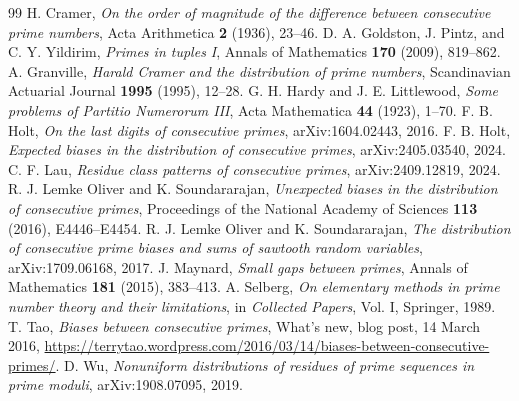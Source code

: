 \documentclass[10pt]{article}
\begin{document}
\begin{thebibliography}{99}
 H. Cramer, \emph{On the order of magnitude of the difference between consecutive prime numbers}, Acta Arithmetica \textbf{2} (1936), 23--46.
 D. A. Goldston, J. Pintz, and C. Y. Yildirim, \emph{Primes in tuples I}, Annals of Mathematics \textbf{170} (2009), 819--862.
 A. Granville, \emph{Harald Cramer and the distribution of prime numbers}, Scandinavian Actuarial Journal \textbf{1995} (1995), 12--28.
 G. H. Hardy and J. E. Littlewood, \emph{Some problems of Partitio Numerorum III}, Acta Mathematica \textbf{44} (1923), 1--70.
 F. B. Holt, \emph{On the last digits of consecutive primes}, arXiv:1604.02443, 2016.
 F. B. Holt, \emph{Expected biases in the distribution of consecutive primes}, arXiv:2405.03540, 2024.
 C. F. Lau, \emph{Residue class patterns of consecutive primes}, arXiv:2409.12819, 2024.
 R. J. Lemke Oliver and K. Soundararajan, \emph{Unexpected biases in the distribution of consecutive primes}, Proceedings of the National Academy of Sciences \textbf{113} (2016), E4446--E4454.
 R. J. Lemke Oliver and K. Soundararajan, \emph{The distribution of consecutive prime biases and sums of sawtooth random variables}, arXiv:1709.06168, 2017.
 J. Maynard, \emph{Small gaps between primes}, Annals of Mathematics \textbf{181} (2015), 383--413.
 A. Selberg, \emph{On elementary methods in prime number theory and their limitations}, in \emph{Collected Papers}, Vol. I, Springer, 1989.
 T. Tao, \emph{Biases between consecutive primes}, What's new, blog post, 14 March 2016, \url{https://terrytao.wordpress.com/2016/03/14/biases-between-consecutive-primes/}.
 D. Wu, \emph{Nonuniform distributions of residues of prime sequences in prime moduli}, arXiv:1908.07095, 2019.
\end{thebibliography}
\end{document}
